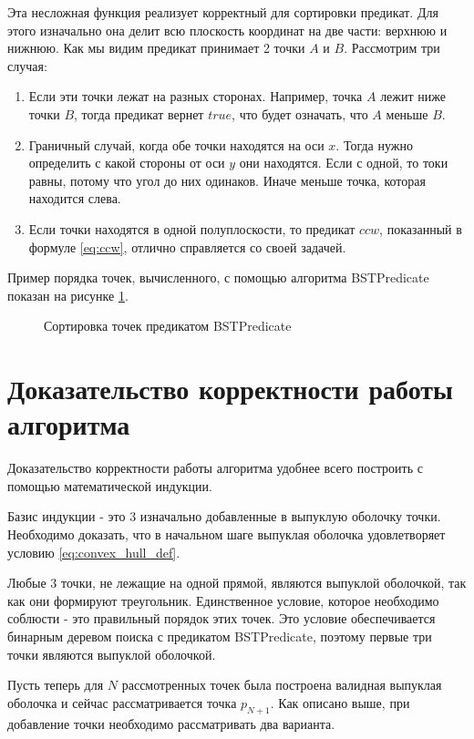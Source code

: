 Эта несложная функция реализует корректный для сортировки предикат. Для этого изначально она делит всю плоскость координат на две части: верхнюю и нижнюю. Как мы видим предикат принимает 2 точки $A$ и $B$. Рассмотрим три случая:
\begin{enumerate}
	\item Если эти точки лежат на разных сторонах. Например, точка $A$ лежит ниже точки $B$, тогда предикат вернет $true$, что будет означать, что $A$ меньше $B$.
	\item Граничный случай, когда обе точки находятся на оси $x$. Тогда нужно определить с какой стороны от оси $y$ они находятся. Если с одной, то токи равны, потому что угол до них одинаков. Иначе меньше точка, которая находится слева.
	\item Если точки находятся в одной полуплоскости, то предикат $ccw$, показанный в формуле \ref{eq:ccw}, отлично справляется со своей задачей.
\end{enumerate}

Пример порядка точек, вычисленного, с помощью алгоритма BSTPredicate показан на рисунке \ref{img:BSTPred_ordering}.

\begin{figure}[H]
	\centering
	
	\caption{Сортировка точек предикатом BSTPredicate}
	\label{img:BSTPred_ordering}
\end{figure}

\section{Доказательство корректности работы алгоритма} \label{subsect2_3}

Доказательство корректности работы алгоритма удобнее всего построить с помощью математической индукции.

Базис индукции - это 3 изначально добавленные в выпуклую оболочку точки. Необходимо доказать, что в начальном шаге выпуклая оболочка удовлетворяет условию \ref{eq:convex_hull_def}.

Любые 3 точки, не лежащие на одной прямой, являются выпуклой оболочкой, так как они формируют треугольник. Единственное условие, которое необходимо соблюсти - это правильный порядок этих точек. Это условие обеспечивается бинарным деревом поиска с предикатом BSTPredicate, поэтому первые три точки являются выпуклой оболочкой.

Пусть теперь для $N$ рассмотренных точек была построена валидная выпуклая оболочка и сейчас рассматривается точка $p_{N+1}$. Как описано выше, при добавление точки необходимо рассматривать два варианта.

